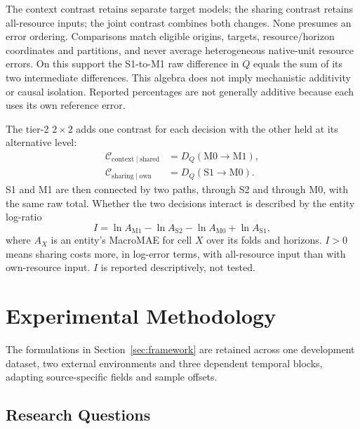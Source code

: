 \documentclass[a4paper,fleqn]{cas-dc}
\begin{document}
The context contrast retains separate target models; the sharing contrast
retains all-resource inputs; the joint contrast combines both changes.
None presumes an error ordering. Comparisons match eligible origins, targets,
resource/horizon coordinates and partitions, and never average heterogeneous
native-unit resource errors. On this support the S1-to-M1 raw difference in
$Q$ equals the sum of its two intermediate differences. This algebra does
not imply mechanistic additivity or causal isolation. Reported percentages
are not generally additive because each uses its own reference error.

The tier-2 $2\times2$ adds one contrast for each decision with the other
held at its alternative level:
\begin{equation}
  \begin{aligned}
    \mathcal{C}_{\mathrm{context}\mid\mathrm{shared}}
      &= D_Q(\mathrm{M0}\rightarrow\mathrm{M1}), \\
    \mathcal{C}_{\mathrm{sharing}\mid\mathrm{own}}
      &= D_Q(\mathrm{S1}\rightarrow\mathrm{M0}).
  \end{aligned}
  \label{eq:tier2-contrasts}
\end{equation}
S1 and M1 are then connected by two paths, through S2 and through M0, with
the same raw total. Whether the two decisions interact is described by the
entity log-ratio
\begin{equation}
  I=\ln A_{\mathrm{M1}}-\ln A_{\mathrm{S2}}-\ln A_{\mathrm{M0}}
    +\ln A_{\mathrm{S1}},
  \label{eq:interaction}
\end{equation}
where $A_X$ is an entity's MacroMAE for cell $X$ over its folds and horizons.
$I>0$ means sharing costs more, in log-error terms, with all-resource input
than with own-resource input. $I$ is reported descriptively, not tested.

\section{Experimental Methodology}
\label{sec:methodology}

The formulations in Section~\ref{sec:framework} are retained across one
development dataset, two external environments and three dependent temporal
blocks, adapting source-specific fields and sample offsets.

\subsection{Research Questions}
\label{sec:research-questions}
\end{document}
